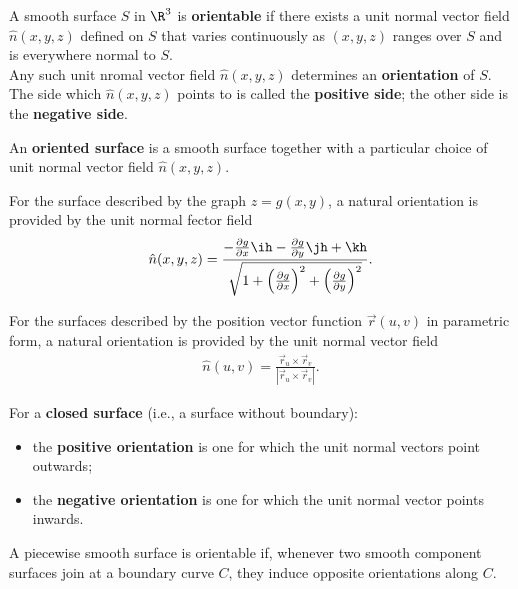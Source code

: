 \documentclass{article}
\begin{document}
\begin{definition}
    A smooth surface $S$ in $\R^3$ is \textbf{orientable} if there exists a unit normal vector
    field $\hat n(x,y,z)$ defined on $S$ that varies continuously as $(x,y,z)$ ranges over $S$
    and is everywhere normal to $S$.\\
    Any such unit nromal vector field $\hat n(x,y,z)$ determines an \textbf{orientation} of $S$.
    The side which $\hat n(x,y,z)$ points to is called the \textbf{positive side}; the other side is the
    \textbf{negative side}.
\end{definition}
\begin{definition}
    An \textbf{oriented surface} is a smooth surface together with a particular choice of unit
    normal vector field $\hat n(x,y,z)$.
\end{definition}
\begin{lemma}
    For the surface described by the graph $z=g(x,y)$, a natural orientation is provided by
    the unit normal fector field
    \begin{align*}
        \hat n(x,y,z)=\frac{-\frac{\partial g}{\partial x}\ih -\frac{\partial g}{\partial y}\jh + \kh}{\sqrt{1+\left(\frac{\partial g}{\partial x}\right)^2 + \left(\frac{\partial g}{\partial y}\right)^2}}.
    \end{align*}
\end{lemma}
\begin{lemma}
    For the surfaces described by the position vector function $\vec r(u,v)$ in parametric form,
    a natural orientation is provided by the unit normal vector field
    \begin{align*}
        \hat n(u,v) = \frac{\vec r_u \times \vec r_v}{|\vec r_u \times \vec r_v|}.
    \end{align*}
\end{lemma}
\begin{definition}
    For a \textbf{closed surface} (i.e., a surface without boundary):
    \begin{itemize}
        \item the \textbf{positive orientation} is one for which the unit normal vectors point outwards;
        \item the \textbf{negative orientation} is one for which the unit normal vector points inwards.
    \end{itemize}
\end{definition}
\begin{definition}
    A piecewise smooth surface is orientable if, whenever two smooth component surfaces join
    at a boundary curve $C$, they induce opposite orientations along $C$.
\end{definition}
\end{document}
